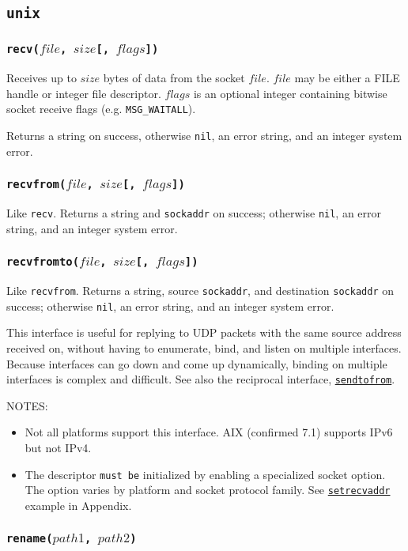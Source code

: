 \documentclass[11pt, oneside]{memoir}
\newcommand*{\nil}[0]{\texttt{nil}\xspace}
\newcommand*{\syscall}[1]{\texttt{#1}\xspace}
\newcommand*{\fn}[1]{\texttt{#1}\xspace}
\newcommand*{\otherwise}[1]{otherwise #1, an error string, and an integer system error}
\newcommand*{\sockaddr}[0]{\texttt{sockaddr}\xspace}
\newcommand*{\mustbe}[0]{\texttt{must be}\xspace}
\newcommand*{\seefn}[1]{\hyperref[#1]{\fn{#1}}\xspace}
\newcounter{toccols}
\newenvironment{Module}[1]{
	\subsection{\texttt{#1}}
	\addtocontents{toc}{
		\protect\begin{multicols}{\value{toccols}}
	}
}{
	\addtocontents{toc}{\protect\end{multicols}}
}
\begin{document}
\begin{Module}{unix}
\subsubsection[\fn{recv}]{\fn{recv($file$, $size$[, $flags$])}}

Receives up to $size$ bytes of data from the socket $file$. $file$ may be either a FILE handle or integer file descriptor. $flags$ is an optional integer containing bitwise socket receive flags (e.g. \texttt{MSG\_WAITALL}).

Returns a string on success, \otherwise{\nil}.

\subsubsection[\fn{recvfrom}]{\fn{recvfrom($file$, $size$[, $flags$])}}

Like \syscall{recv}. Returns a string and \sockaddr on success; \otherwise{\nil}.

\subsubsection[\fn{recvfromto}]{\fn{recvfromto($file$, $size$[, $flags$])}}

\label{recvfromto}

Like \syscall{recvfrom}. Returns a string, source \sockaddr, and destination \sockaddr on success; \otherwise{\nil}.

This interface is useful for replying to UDP packets with the same source address received on, without having to enumerate, bind, and listen on multiple interfaces. Because interfaces can go down and come up dynamically, binding on multiple interfaces is complex and difficult. See also the reciprocal interface, \seefn{sendtofrom}.

NOTES:
\begin{itemize}
\item Not all platforms support this interface. AIX (confirmed 7.1) supports IPv6 but not IPv4.
\item The descriptor \mustbe initialized by enabling a specialized socket option. The option varies by platform and socket protocol family. See \seefn{setrecvaddr} example in Appendix.
\end{itemize}

\subsubsection[\fn{rename}]{\fn{rename($path1$, $path2$)}}


\end{Module}
\end{document}
